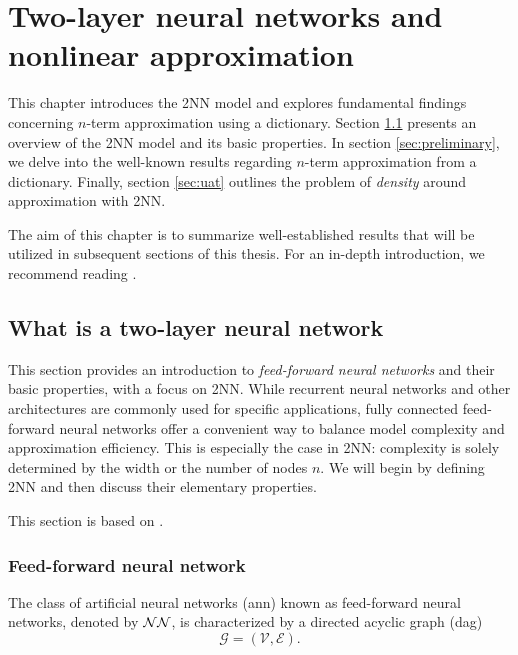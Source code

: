 \chapter{Two-layer neural networks and nonlinear approximation}
\label{ch:preliminary}

This chapter introduces the 2NN model and explores fundamental findings
concerning $n$-term approximation using a dictionary. Section
\ref{sec:what_is_2nn} presents an overview of the 2NN model and its basic
properties. In section \ref{sec:preliminary}, we delve into the well-known
results regarding $n$-term approximation from a dictionary. Finally, section
\ref{sec:uat} outlines the problem of \textit{density} around approximation with
2NN.

The aim of this chapter is to summarize well-established results that will be
utilized in subsequent sections of this thesis. For an in-depth introduction, we
recommend reading \cite{devore_1998,pinkusApproximationTheoryMLP1999}.


\section{What is a two-layer neural network}
\label{sec:what_is_2nn}

This section provides an introduction to \textit{feed-forward neural networks}
and their basic properties, with a focus on 2NN. While recurrent neural networks
and other architectures are commonly used for specific applications, fully
connected feed-forward neural networks offer a convenient way to balance model
complexity and approximation efficiency. This is especially the case in 2NN:
complexity is solely determined by the width or the number of nodes $n$. We will
begin by defining 2NN and then discuss their elementary properties.

This section is based on \cite{devoreNeuralNetworkApproximation2021,
shalev-shwartzUnderstandingMachineLearning2014}.

\subsection{Feed-forward neural network}

The class of artificial neural networks (\gls{ann}) known as feed-forward neural
networks, denoted by $\mathcal{NN}$, is characterized by a directed acyclic graph
(\gls{dag})
\begin{equation*}
    \mathcal{G} = (\mathcal{V}, \mathcal{E}).
\end{equation*}


